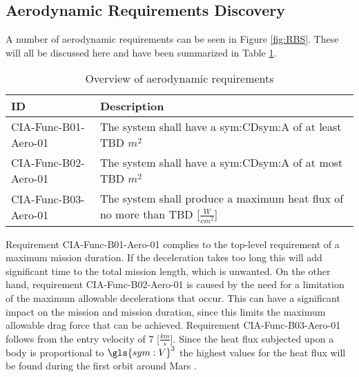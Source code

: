 \subsection{Aerodynamic Requirements Discovery} 
\label{sec:aero}
A number of aerodynamic requirements can be seen in Figure \ref{fig:RBS}. These will all be discussed here and have been summarized in Table \ref{tab:aeroreqs}. 


\begin{table}[h]
	\caption{Overview of aerodynamic requirements}
	\label{tab:aeroreqs}
	\begin{tabular}{|p{}|p{}|}
		\hline
		ID & Description \\
		\hline \hline
		CIA-Func-B01-Aero-01 & The system shall have a \gls{sym:CD}\gls{sym:A} of at least TBD $m^{2}$ \\ \hline
		CIA-Func-B02-Aero-01 & The system shall have a \gls{sym:CD}\gls{sym:A} of at most TBD $m^{2}$ \\ \hline
		CIA-Func-B03-Aero-01 & The system shall produce a maximum heat flux of no more than TBD [$\frac{W}{cm^{2}}$] \\ \hline
	\end{tabular}
\end{table}
Requirement CIA-Func-B01-Aero-01 complies to the top-level requirement of a maximum mission duration. If the deceleration takes too long this will add significant time to the total mission length, which is unwanted.
On the other hand, requirement CIA-Func-B02-Aero-01 is caused by the need for a limitation of the maximum allowable decelerations that occur. This can have a significant impact on the mission and mission duration, since this limits the maximum allowable drag force that can be achieved.
Requirement CIA-Func-B03-Aero-01 follows from the entry velocity of 7 [$\frac{km}{s}$]. Since the heat flux subjected upon a body is proportional to $\gls{sym:V}^{3}$ the highest values for the heat flux will be found during the first orbit around Mars \cite{Tauber1986}.